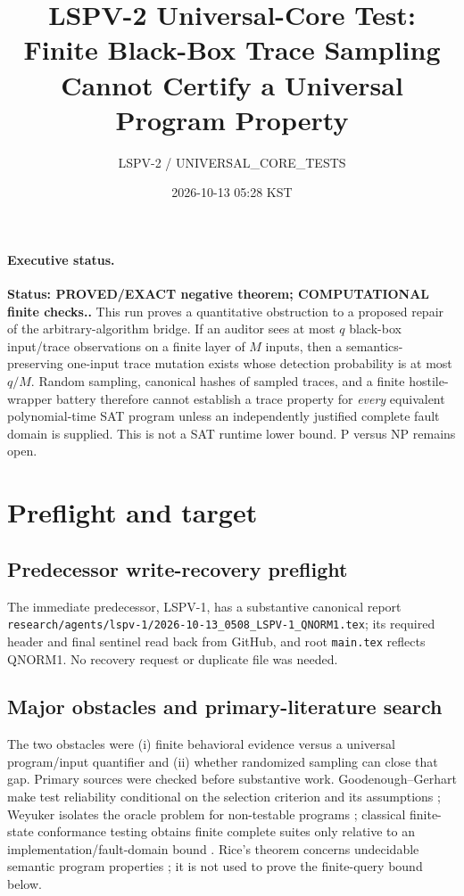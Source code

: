 \documentclass[11pt]{article}
\title{LSPV-2 Universal-Core Test: Finite Black-Box Trace Sampling Cannot Certify a Universal Program Property}
\author{LSPV-2 / UNIVERSAL\_CORE\_TESTS}
\date{2026-10-13 05:28 KST}
\newcommand{\Status}[1]{\textbf{Status: #1.}}
\begin{document}
\maketitle

\paragraph{Executive status.}
\Status{PROVED/EXACT negative theorem; COMPUTATIONAL finite checks.}
This run proves a quantitative obstruction to a proposed repair of the arbitrary-algorithm bridge.  If an auditor sees at most $q$ black-box input/trace observations on a finite layer of $M$ inputs, then a semantics-preserving one-input trace mutation exists whose detection probability is at most $q/M$.  Random sampling, canonical hashes of sampled traces, and a finite hostile-wrapper battery therefore cannot establish a trace property for \emph{every} equivalent polynomial-time SAT program unless an independently justified complete fault domain is supplied.  This is not a SAT runtime lower bound.  P versus NP remains open.

\section{Preflight and target}

\subsection*{Predecessor write-recovery preflight}
The immediate predecessor, LSPV-1, has a substantive canonical report
\texttt{research/agents/lspv-1/2026-10-13\_0508\_LSPV-1\_QNORM1.tex}; its required header and final sentinel read back from GitHub, and root \texttt{main.tex} reflects QNORM1.  No recovery request or duplicate file was needed.

\subsection*{Major obstacles and primary-literature search}
The two obstacles were (i) finite behavioral evidence versus a universal program/input quantifier and (ii) whether randomized sampling can close that gap.  Primary sources were checked before substantive work.  Goodenough--Gerhart make test reliability conditional on the selection criterion and its assumptions \cite{goodenough1975}; Weyuker isolates the oracle problem for non-testable programs \cite{weyuker1982}; classical finite-state conformance testing obtains finite complete suites only relative to an implementation/fault-domain bound \cite{vasilevskii1973,chow1978}.  Rice's theorem concerns undecidable semantic program properties \cite{rice1953}; it is not used to prove the finite-query bound below.
\end{document}
